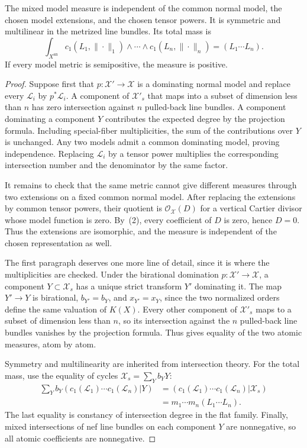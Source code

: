 \begin{theorem}\label{thm:cl-model-properties}
The mixed model measure is independent of the common normal model, the chosen
model extensions, and the chosen tensor powers. It is symmetric and
multilinear in the metrized line bundles. Its total mass is
\[
 \int_{X^{\mathrm{an}}}
 c_1(L_1,\|\cdot\|_1)\wedge\cdots\wedge
 c_1(L_n,\|\cdot\|_n)
                  =(L_1\cdots L_n).
\]
If every model metric is semipositive, the measure is positive.
\end{theorem}

\begin{proof}
Suppose first that $p:\mathcal X'\to\mathcal X$ is a dominating normal
model and replace every $\mathcal L_i$ by $p^*\mathcal L_i$. A component
of $\mathcal X'_s$ that maps into a subset of dimension less than $n$
has zero intersection against $n$ pulled-back line bundles. A component
dominating a component $Y$ contributes the expected degree by the
projection formula. Including special-fiber multiplicities, the sum of the
contributions over $Y$ is unchanged. Any two models admit a common
dominating model, proving independence. Replacing $\mathcal L_i$ by a
tensor power multiplies the corresponding intersection number and the
denominator by the same factor.

It remains to check that the same metric cannot give different measures
through two extensions on a fixed common normal model. After replacing the
extensions by common tensor powers, their quotient is
$\mathcal O_{\mathcal X}(D)$ for a vertical Cartier divisor
whose model function is zero. By
\,(2), every coefficient of $D$
is zero, hence $D=0$. Thus the extensions are isomorphic, and the measure
is independent of the chosen representation as well.

The first paragraph deserves one more line of detail, since it is where the
multiplicities are checked.  Under the birational domination
$p:\mathcal X'\to\mathcal X$, a component $Y\subset\mathcal X_s$ has a
unique strict transform $Y'$ dominating it.  The map $Y'\to Y$ is
birational, $b_{Y'}=b_Y$, and $x_{Y'}=x_Y$, since the two normalized
orders define the same valuation of $K(X)$.  Every other component of
$\mathcal X'_s$ maps to a subset of dimension less than $n$, so its
intersection against the $n$ pulled-back line bundles vanishes by the
projection formula.  Thus  gives equality
of the two atomic measures, atom by atom.

Symmetry and multilinearity are inherited from intersection theory. For the
total mass, use the equality of cycles
$\mathcal X_s=\sum_Yb_YY$:
\[
\begin{split}
 \sum_Yb_Y
  (c_1(\mathcal L_1)\cdots c_1(\mathcal L_n)|Y)
 &=(c_1(\mathcal L_1)\cdots c_1(\mathcal L_n)|\mathcal X_s)\\
 &=m_1\cdots m_n(L_1\cdots L_n).
\end{split}
\]
The last equality is constancy of intersection degree in the flat family.
Finally, mixed intersections of nef line bundles on each component $Y$
are nonnegative, so all atomic coefficients are nonnegative.
\end{proof}


